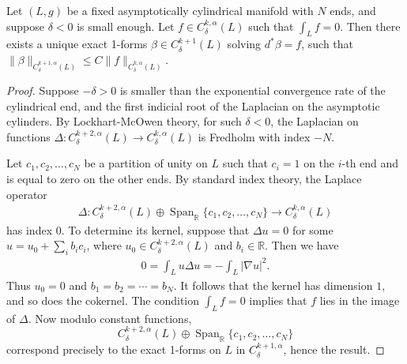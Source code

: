 \documentclass[10pt,a4paper]{amsart}
\begin{document}
	\begin{lem}
		\label{lem:zero_average}
		Let $(L,g)$ be a fixed
		asymptotically cylindrical manifold  with $N$ ends, and suppose $\delta<0$ is small enough. Let
		$f \in C^{k,\alpha}_\delta(L)$ such that $\int_L f=0$. Then there exists a unique exact 1-forms $\beta\in C^{k+1}_\delta(L)$ solving $d^*\beta= f$, such that
		$ 
		\|\beta\|_{C^{k+1,\alpha}_\delta(L)}  \le C\|f\|_{C^{k,\alpha}_\delta(L)}  $. 
		
	\end{lem}

	\begin{proof}
		Suppose $-\delta>0$ is smaller than the exponential convergence rate of the cylindrical end, and the  first indicial root of the Laplacian on the asymptotic cylinders. By Lockhart-McOwen theory, for such $\delta < 0$, the Laplacian on functions
		$\Delta: C^{k+2,\alpha}_{\delta}(L) \to C^{k,\alpha}_{\delta}(L)$ is
		Fredholm with index $-N$. 
		
		
		
		
		Let $c_1, c_2, \ldots, c_N$ be a partition of unity on $L$ such that
		$c_i=1$ on the $i$-th end and is equal to zero on the other ends.  
		By standard index theory, the Laplace
		operator
		\begin{align*}
			\Delta:
			C^{k+2,\alpha}_{\delta}(L) \oplus \operatorname{Span}_{\mathbb{R}}\{c_1,c_2,\ldots, c_N\}
			\to
			C^{k,\alpha}_{\delta}(L)
		\end{align*}
		has index $0$. To determine its kernel, suppose that
		$ 
		\Delta u = 0
		$ 
		for some $u = u_0 + \sum_i b_i c_i$, where
		$u_0 \in C^{k+2,\alpha}_{\delta}(L)$ and $b_i \in \mathbb{R}$. Then we have
		\begin{align*}
			0 = \int_L u\Delta u  = - \int_L |\nabla u|^2.
		\end{align*}
		Thus $u_0 = 0$ and $b_1 = b_2 = \cdots = b_N$. It follows that the
		kernel has dimension $1$, and so does the cokernel. The condition
		$\int_L f = 0$ implies that $f$ lies in the image of
		$\Delta$. Now modulo constant functions,
		\[
		C^{k+2,\alpha}_{\delta}(L) \oplus \operatorname{Span}_{\mathbb{R}}\{c_1,c_2,\ldots, c_N\}  \]
		correspond precisely to the exact 1-forms on $L$ in $C^{k+1,\alpha}_\delta$, hence the result.
	\end{proof}
\end{document}
